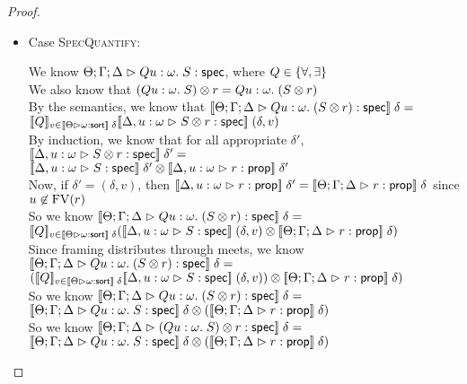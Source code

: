 \begin{proof}
\begin{itemize}
    \item Case \textsc{SpecQuantify}:
      \begin{tabbedproof}
        \oo We know $\judgeS{Q u:\omega.\; S}$, where $Q \in \setof{\forall, \exists}$ \\
        \oo We also know that $\Frame{(Q u:\omega.\; S)}{r} = Q u:\omega.\; (\Frame{S}{r})$ \\
        \oo By the semantics, we know that $\interp{\judgeS{Q u:\omega.\; (\Frame{S}{r)}}}\;\delta = $ \\
        \oox $\interp{Q}_{v \in \interp{\judgeSort{\omega}}\;\delta} \interp{\judgeS[\Delta, u:\omega]{\Frame{S}{r}}}\;(\delta, v)$\\
        \oo By induction, we know that for all appropriate $\delta'$, 
               $\interp{\judgeS[\Delta, u:\omega]{\Frame{S}{r}}}\;\delta' = $ \\
        \oox $\Frame{\interp{\judgeS[\Delta, u:\omega]{S}}\;\delta'}{\interp{\judgeA[\Delta, u:\omega]{r}{\assert}}\;\delta'}$ \\
        \oo Now, if $\delta' = (\delta, v)$, then $\interp{\judgeA[\Delta, u:\omega]{r}{\assert}}\;\delta' = 
                                                   \interp{\judgeA{r}{\assert}}\;\delta$ since $u \not\in \FV{r}$ \\
        \oo So we know $\interp{\judgeS{Q u:\omega.\; (\Frame{S}{r)}}}\;\delta = $ \\
        \oox $\interp{Q}_{v \in \interp{\judgeSort{\omega}}\;\delta} (\Frame{\interp{\judgeS[\Delta, u:\omega]{S}}\;(\delta,v)}{\interp{\judgeA{r}{\assert}}\;\delta})$ \\
        \oo Since framing distributes through meets, we know $\interp{\judgeS{Q u:\omega.\; (\Frame{S}{r)}}}\;\delta = $ \\
        \oox $\Frame{(\interp{Q}_{v \in \interp{\judgeSort{\omega}}\;\delta} \interp{\judgeS[\Delta, u:\omega]{S}}\;(\delta,v))}{\interp{\judgeA{r}{\assert}}\;\delta})$ \\
        \oo So we know $\interp{\judgeS{Q u:\omega.\; (\Frame{S}{r)}}}\;\delta = $ \\
        \oox $\Frame{\interp{\judgeS{Q u:\omega.\;S}}\;\delta}{(\interp{\judgeA{r}{\assert}}\;\delta)}$ \\
        \oo So we know $\interp{\judgeS{\Frame{(Q u:\omega.\; S)}{r}}}\;\delta = $ \\
        \oox $\Frame{\interp{\judgeS{Q u:\omega.\;S}}\;\delta}{(\interp{\judgeA{r}{\assert}}\;\delta)}$ \\
        
      \end{tabbedproof}
  \end{itemize}
\end{proof}





